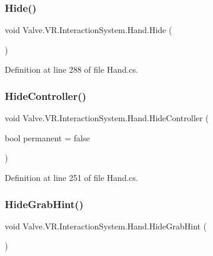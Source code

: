 \subsubsection{\texorpdfstring{Hide()}{Hide()}}
{\footnotesize\ttfamily void Valve.\+V\+R.\+Interaction\+System.\+Hand.\+Hide (\begin{DoxyParamCaption}{ }\end{DoxyParamCaption})}



Definition at line 288 of file Hand.\+cs.

\mbox{\label{class_valve_1_1_v_r_1_1_interaction_system_1_1_hand_a3eaf975b231ccd8bec17ef88bd20f0f1}} 
\subsubsection{\texorpdfstring{HideController()}{HideController()}}
{\footnotesize\ttfamily void Valve.\+V\+R.\+Interaction\+System.\+Hand.\+Hide\+Controller (\begin{DoxyParamCaption}\item[{bool}]{permanent = {\ttfamily false} }\end{DoxyParamCaption})}



Definition at line 251 of file Hand.\+cs.

\mbox{\label{class_valve_1_1_v_r_1_1_interaction_system_1_1_hand_a186d8af3a990ec94164f6aa62ac1d2c4}} 
\subsubsection{\texorpdfstring{HideGrabHint()}{HideGrabHint()}}
{\footnotesize\ttfamily void Valve.\+V\+R.\+Interaction\+System.\+Hand.\+Hide\+Grab\+Hint (\begin{DoxyParamCaption}{ }\end{DoxyParamCaption})}



